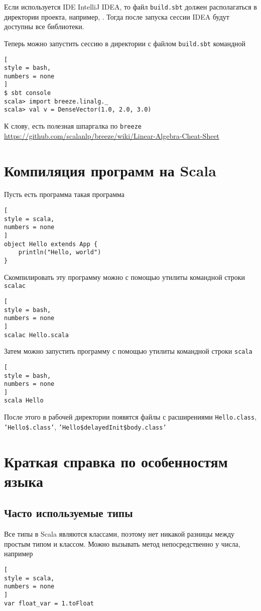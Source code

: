\documentclass[%
	11pt,
	a4paper,
	utf8,
		]{article}
\begin{document}
Если используется IDE IntelliJ IDEA, то файл \texttt{build.sbt} должен располагаться в директории проекта, например, . Тогда после запуска сессии IDEA будут доступны все библиотеки.

Теперь можно запустить сессию в директории с файлом \texttt{build.sbt} командной
\begin{lstlisting}[
style = bash,
numbers = none
]
$ sbt console
scala> import breeze.linalg._
scala> val v = DenseVector(1.0, 2.0, 3.0)
\end{lstlisting}

К слову, есть полезная шпаргалка по \texttt{breeze} \url{https://github.com/scalanlp/breeze/wiki/Linear-Algebra-Cheat-Sheet}

\section{Компиляция программ на Scala}

Пусть есть программа такая программа
\begin{lstlisting}[
style = scala,
numbers = none	
]
object Hello extends App {
	println("Hello, world")
}
\end{lstlisting}

Скомпилировать эту программу можно с помощью утилиты командной строки \texttt{scalac}
\begin{lstlisting}[
style = bash,
numbers = none	
]
scalac Hello.scala
\end{lstlisting}

Затем можно запустить программу с помощью утилиты командной строки \texttt{scala}
\begin{lstlisting}[
style = bash,
numbers = none	
]
scala Hello
\end{lstlisting}

После этого в рабочей директории появятся файлы с расширениями \texttt{Hello.class}, \texttt{'Hello\$.class'}, \texttt{'Hello\$delayedInit\$body.class'}

\section{Краткая справка по особенностям языка}

\subsection{Часто используемые типы}

Все типы в Scala являются классами, поэтому нет никакой разницы между простым типом и классом. Можно вызывать метод непосредственно у числа, например
\begin{lstlisting}[
style = scala,
numbers = none
]
var float_var = 1.toFloat
\end{lstlisting}
\end{document}
